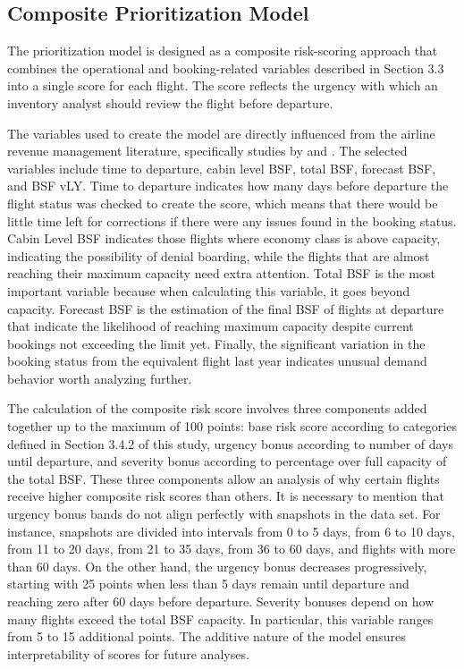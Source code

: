 \subsection{Composite Prioritization Model}
\label{subsec:composite}

The prioritization model is designed as a composite risk-scoring approach that combines the operational and booking-related variables described in Section 3.3 into a single score for each flight. The score reflects the urgency with which an inventory analyst should review the flight before departure.

The variables used to create the model are directly influenced from the airline revenue management literature, specifically studies by \citet{Belobaba1987, Belobaba1989} and \citet{LeeHersh1993}. The selected variables include time to departure, cabin level BSF, total BSF, forecast BSF, and BSF vLY. Time to departure indicates how many days before departure the flight status was checked to create the score, which means that there would be little time left for corrections if there were any issues found in the booking status. Cabin Level BSF indicates those flights where economy class is above capacity, indicating the possibility of denial boarding, while the flights that are almost reaching their maximum capacity need extra attention. Total BSF is the most important variable because when calculating this variable, it goes beyond capacity. Forecast BSF is the estimation of the final BSF of flights at departure that indicate the likelihood of reaching maximum capacity despite current bookings not exceeding the limit yet. Finally, the significant variation in the booking status from the equivalent flight last year indicates unusual demand behavior worth analyzing further.

The calculation of the composite risk score involves three components added together up to the maximum of 100 points: base risk score according to categories defined in Section 3.4.2 of this study, urgency bonus according to number of days until departure, and severity bonus according to percentage over full capacity of the total BSF. These three components allow an analysis of why certain flights receive higher composite risk scores than others. It is necessary to mention that urgency bonus bands do not align perfectly with snapshots in the data set. For instance, snapshots are divided into intervals from 0 to 5 days, from 6 to 10 days, from 11 to 20 days, from 21 to 35 days, from 36 to 60 days, and flights with more than 60 days. On the other hand, the urgency bonus decreases progressively, starting with 25 points when less than 5 days remain until departure and reaching zero after 60 days before departure. Severity bonuses depend on how many flights exceed the total BSF capacity. In particular, this variable ranges from 5 to 15 additional points. The additive nature of the model ensures interpretability of scores for future analyses.

